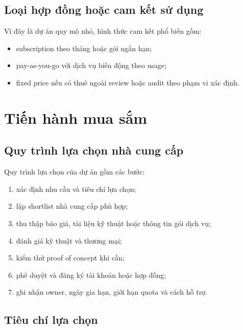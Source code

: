 \subsection{Loại hợp đồng hoặc cam kết sử dụng}

Vì đây là dự án quy mô nhỏ, hình thức cam kết phổ biến gồm:

\begin{itemize}
  \item subscription theo tháng hoặc gói ngắn hạn;
  \item pay-as-you-go với dịch vụ biến động theo usage;
  \item fixed price nếu có thuê ngoài review hoặc audit theo phạm vi xác định.
\end{itemize}


\fi
\section{Tiến hành mua sắm}
\iffalse

\subsection{Quy trình lựa chọn nhà cung cấp}

Quy trình lựa chọn của dự án gồm các bước:

\begin{enumerate}
  \item xác định nhu cầu và tiêu chí lựa chọn;
  \item lập shortlist nhà cung cấp phù hợp;
  \item thu thập báo giá, tài liệu kỹ thuật hoặc thông tin gói dịch vụ;
  \item đánh giá kỹ thuật và thương mại;
  \item kiểm thử proof of concept khi cần;
  \item phê duyệt và đăng ký tài khoản hoặc hợp đồng;
  \item ghi nhận owner, ngày gia hạn, giới hạn quota và cách hỗ trợ.
\end{enumerate}

\subsection{Tiêu chí lựa chọn}

